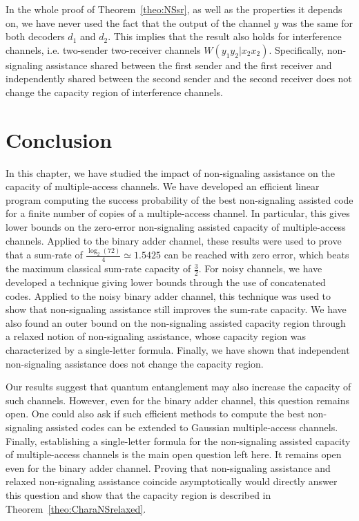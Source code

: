 \begin{rk}
  In the whole proof of Theorem~\ref{theo:NSsr}, as well as the properties it depends on, we have never used the fact that the output of the channel $y$ was the same for both decoders $d_1$ and $d_2$. This implies that the result also holds for interference channels, i.e. two-sender two-receiver channels $W(y_1y_2|x_2x_2)$. Specifically, non-signaling assistance shared between the first sender and the first receiver and independently shared between the second sender and the second receiver does not change the capacity region of interference channels.
\end{rk}
  
\section{Conclusion}
In this chapter, we have studied the impact of non-signaling assistance on the capacity of multiple-access channels. We have developed an efficient linear program computing the success probability of the best non-signaling assisted code for a finite number of copies of a multiple-access channel. In particular, this gives lower bounds on the zero-error non-signaling assisted capacity of multiple-access channels.
Applied to the binary adder channel, these results were used to prove that a sum-rate of $\frac{\log_2(72)}{4} \simeq 1.5425$ can be reached with zero error, which beats the maximum classical sum-rate capacity of $\frac{3}{2}$. For noisy channels, we have developed a technique giving lower bounds through the use of concatenated codes. Applied to the noisy binary adder channel, this technique was used to show that non-signaling assistance still improves the sum-rate capacity. We have also found an outer bound on the non-signaling assisted capacity region through a relaxed notion of non-signaling assistance, whose capacity region was characterized by a single-letter formula. Finally, we have shown that independent non-signaling assistance does not change the capacity region.

Our results suggest that quantum entanglement may also increase the capacity of such channels. However, even for the binary adder channel, this question remains open. One could also ask if such efficient methods to compute the best non-signaling assisted codes can be extended to Gaussian multiple-access channels. Finally, establishing a single-letter formula for the non-signaling assisted capacity of multiple-access channels is the main open question left here. It remains open even for the binary adder channel. Proving that non-signaling assistance and relaxed non-signaling assistance coincide asymptotically would directly answer this question and show that the capacity region is described in Theorem~\ref{theo:CharaNSrelaxed}.
